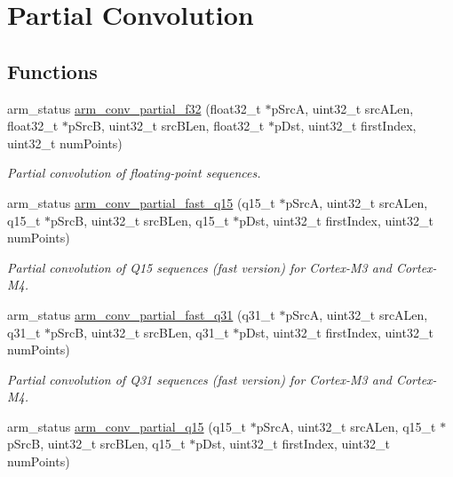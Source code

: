 \hypertarget{group___partial_conv}{\section{Partial Convolution}
\label{group___partial_conv}
}
\subsection*{Functions}
\begin{DoxyCompactItemize}
\item 
arm\-\_\-status \hyperlink{group___partial_conv_ga16d10f32072cd79fc5fb6e785df45f5e}{arm\-\_\-conv\-\_\-partial\-\_\-f32} (float32\-\_\-t $\ast$p\-Src\-A, uint32\-\_\-t src\-A\-Len, float32\-\_\-t $\ast$p\-Src\-B, uint32\-\_\-t src\-B\-Len, float32\-\_\-t $\ast$p\-Dst, uint32\-\_\-t first\-Index, uint32\-\_\-t num\-Points)
\begin{DoxyCompactList}\small\item\em Partial convolution of floating-\/point sequences. \end{DoxyCompactList}\item 
arm\-\_\-status \hyperlink{group___partial_conv_ga1e4d43385cb62262a78c6752fe1fafb2}{arm\-\_\-conv\-\_\-partial\-\_\-fast\-\_\-q15} (q15\-\_\-t $\ast$p\-Src\-A, uint32\-\_\-t src\-A\-Len, q15\-\_\-t $\ast$p\-Src\-B, uint32\-\_\-t src\-B\-Len, q15\-\_\-t $\ast$p\-Dst, uint32\-\_\-t first\-Index, uint32\-\_\-t num\-Points)
\begin{DoxyCompactList}\small\item\em Partial convolution of Q15 sequences (fast version) for Cortex-\/\-M3 and Cortex-\/\-M4. \end{DoxyCompactList}\item 
arm\-\_\-status \hyperlink{group___partial_conv_ga10c5294cda8c4985386f4e3944be7650}{arm\-\_\-conv\-\_\-partial\-\_\-fast\-\_\-q31} (q31\-\_\-t $\ast$p\-Src\-A, uint32\-\_\-t src\-A\-Len, q31\-\_\-t $\ast$p\-Src\-B, uint32\-\_\-t src\-B\-Len, q31\-\_\-t $\ast$p\-Dst, uint32\-\_\-t first\-Index, uint32\-\_\-t num\-Points)
\begin{DoxyCompactList}\small\item\em Partial convolution of Q31 sequences (fast version) for Cortex-\/\-M3 and Cortex-\/\-M4. \end{DoxyCompactList}\item 
arm\-\_\-status \hyperlink{group___partial_conv_ga209a2a913a0c5e5679c5988da8f46b03}{arm\-\_\-conv\-\_\-partial\-\_\-q15} (q15\-\_\-t $\ast$p\-Src\-A, uint32\-\_\-t src\-A\-Len, q15\-\_\-t $\ast$p\-Src\-B, uint32\-\_\-t src\-B\-Len, q15\-\_\-t $\ast$p\-Dst, uint32\-\_\-t first\-Index, uint32\-\_\-t num\-Points)

\end{DoxyCompactItemize}
